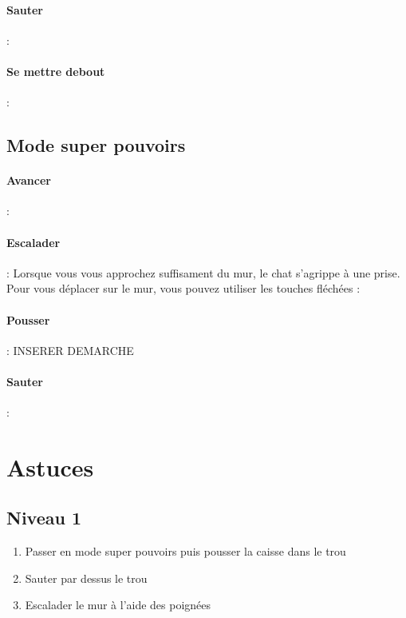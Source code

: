 \documentclass[a4paper,11pt]{article}
\begin{document}
\paragraph{Sauter} : 

\paragraph{Se mettre debout} : 
\subsection{Mode super pouvoirs}
\paragraph{Avancer} : \fbox{$\rightarrow$}

\paragraph{Escalader} : Lorsque vous vous approchez suffisament du mur, le chat s'agrippe à une prise. Pour vous déplacer sur le mur, vous pouvez utiliser les touches fléchées : \fbox{$\uparrow$} \fbox{$\rightarrow$} \fbox{$\downarrow$} \fbox{$\leftarrow$}

\paragraph{Pousser} : INSERER DEMARCHE 

\paragraph{Sauter} : 



\section{Astuces}
\subsection{Niveau 1}
\begin{enumerate}
\item Passer en mode super pouvoirs puis pousser la caisse dans le trou
\item Sauter par dessus le trou
\item Escalader le mur à l'aide des poignées
\end{enumerate}
\end{document}
